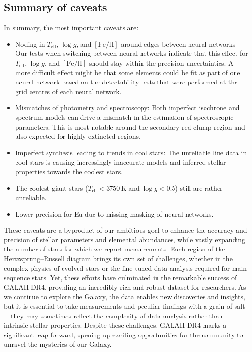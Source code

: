 \documentclass[
  journal=pasa,
  manuscript=research-paper, %
  year=2024,
  volume=37
]{cup-journal}
\newcommand{\Teff}{$T_\mathrm{eff}$\xspace}
\newcommand{\logg}{$\log g$\xspace}
\newcommand{\feh}{$\mathrm{[Fe/H]}$\xspace}
\newcommand{\TLF}{\Teff, \logg, and \feh}
\begin{document}
\subsection{Summary of caveats} \label{sec:caveats_summary}

In summary, the most important caveats are:
\begin{itemize}
    \item Noding in \TLF around edges between neural networks: Our tests when switching between neural networks indicate that this effect for \TLF should stay within the precision uncertainties. A more difficult effect might be that some elements could be fit as part of one neural network based on the detectability tests that were performed at the grid centres of each neural network.
    \item Mismatches of photometry and spectroscopy: Both imperfect isochrone and spectrum models can drive a mismatch in the estimation of spectroscopic parameters. This is most notable around the secondary red clump region and also expected for highly extincted regions.
    \item Imperfect synthesis leading to trends in cool stars: The unreliable line data in cool stars is causing increasingly inaccurate models and inferred stellar properties towards the coolest stars.
    \item The coolest giant stars ($T_\mathrm{eff} < 3750\,\mathrm{K}$ and $\log g < 0.5$) still are rather unreliable.
    \item Lower precision for Eu due to missing masking of neural networks.
\end{itemize}

These caveats are a byproduct of our ambitious goal to enhance the accuracy and precision of stellar parameters and elemental abundances, while vastly expanding the number of stars for which we report measurements. Each region of the Hertzsprung–Russell diagram brings its own set of challenges, whether in the complex physics of evolved stars or the fine-tuned data analysis required for main sequence stars. Yet, these efforts have culminated in the remarkable success of GALAH DR4, providing an incredibly rich and robust dataset for researchers. As we continue to explore the Galaxy, the data enables new discoveries and insights, but it is essential to take measurements and peculiar findings with a grain of salt—they may sometimes reflect the complexity of data analysis rather than intrinsic stellar properties. Despite these challenges, GALAH DR4 marks a significant leap forward, opening up exciting opportunities for the community to unravel the mysteries of our Galaxy.
\end{document}
